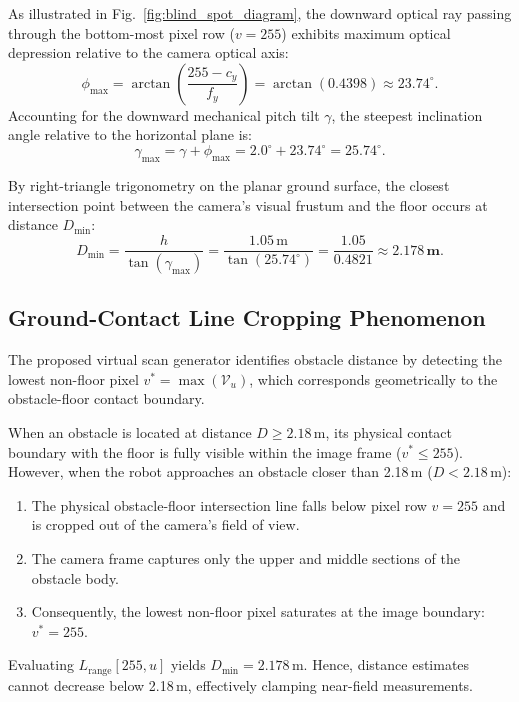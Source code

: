 \documentclass{ieeeaccess}
\begin{document}
As illustrated in Fig.~\ref{fig:blind_spot_diagram}, the downward optical ray passing through the bottom-most pixel row ($v = 255$) exhibits maximum optical depression relative to the camera optical axis:
\begin{equation}
  \phi_{\max} = \arctan\left(\frac{255 - c_y}{f_y}\right) = \arctan(0.4398) \approx 23.74^\circ.
\end{equation}
Accounting for the downward mechanical pitch tilt $\gamma$, the steepest inclination angle relative to the horizontal plane is:
\begin{equation}
  \gamma_{\max} = \gamma + \phi_{\max} = 2.0^\circ + 23.74^\circ = 25.74^\circ.
\end{equation}

By right-triangle trigonometry on the planar ground surface, the closest intersection point between the camera's visual frustum and the floor occurs at distance $D_{\min}$:
\begin{equation}
  D_{\min} = \frac{h}{\tan(\gamma_{\max})} = \frac{1.05\,\text{m}}{\tan(25.74^\circ)} = \frac{1.05}{0.4821} \approx \mathbf{2.178\,\text{m}}.
  \label{eq:d_min}
\end{equation}

\subsection{Ground-Contact Line Cropping Phenomenon}
The proposed virtual scan generator identifies obstacle distance by detecting the lowest non-floor pixel $v^* = \max(\mathcal{V}_u)$, which corresponds geometrically to the obstacle-floor contact boundary. 

When an obstacle is located at distance $D \ge 2.18$\,m, its physical contact boundary with the floor is fully visible within the image frame ($v^* \le 255$). However, when the robot approaches an obstacle closer than 2.18\,m ($D < 2.18$\,m):
\begin{enumerate}
  \item The physical obstacle-floor intersection line falls below pixel row $v = 255$ and is cropped out of the camera's field of view.
  \item The camera frame captures only the upper and middle sections of the obstacle body.
  \item Consequently, the lowest non-floor pixel saturates at the image boundary: $v^* = 255$.
\end{enumerate}
Evaluating $L_{\mathrm{range}}[255, u]$ yields $D_{\min} = 2.178$\,m. Hence, distance estimates cannot decrease below 2.18\,m, effectively clamping near-field measurements.
\end{document}
